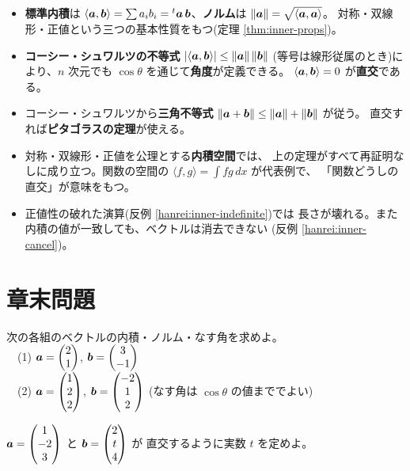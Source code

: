 \begin{matome}
\begin{itemize}
\item \textbf{標準内積}は $\langle \bm{a}, \bm{b} \rangle = \sum a_ib_i
= {}^t\bm{a}\,\bm{b}$、\textbf{ノルム}は
$\|\bm{a}\| = \sqrt{\langle \bm{a}, \bm{a} \rangle}$。
対称・双線形・正値という三つの基本性質をもつ(定理 \ref{thm:inner-props})。
\item \textbf{コーシー・シュワルツの不等式}
$|\langle \bm{a}, \bm{b} \rangle| \le \|\bm{a}\|\,\|\bm{b}\|$
(等号は線形従属のとき)により、$n$ 次元でも
$\cos\theta$ を通じて\textbf{角度}が定義できる。
$\langle \bm{a}, \bm{b} \rangle = 0$ が\textbf{直交}である。
\item コーシー・シュワルツから\textbf{三角不等式}
$\|\bm{a} + \bm{b}\| \le \|\bm{a}\| + \|\bm{b}\|$ が従う。
直交すれば\textbf{ピタゴラスの定理}が使える。
\item 対称・双線形・正値を公理とする\textbf{内積空間}では、
上の定理がすべて再証明なしに成り立つ。関数の空間の
$\langle f, g \rangle = \int f g\,dx$ が代表例で、
「関数どうしの直交」が意味をもつ。
\item 正値性の破れた演算(反例 \ref{hanrei:inner-indefinite})では
長さが壊れる。また内積の値が一致しても、ベクトルは消去できない
(反例 \ref{hanrei:inner-cancel})。
\end{itemize}
\end{matome}

\section*{章末問題}

\begin{mondai}[基本]\label{q:inner-ex1}
次の各組のベクトルの内積・ノルム・なす角を求めよ。\\
　(1) $\bm{a} = \begin{pmatrix}2 \\ 1\end{pmatrix}$, $\bm{b} = \begin{pmatrix}3 \\ -1\end{pmatrix}$\\
　(2) $\bm{a} = \begin{pmatrix}1 \\ 2 \\ 2\end{pmatrix}$, $\bm{b} = \begin{pmatrix}-2 \\ 1 \\ 2\end{pmatrix}$
(なす角は $\cos\theta$ の値まででよい)
\end{mondai}

\begin{mondai}[基本]\label{q:inner-ex2}
$\bm{a} = \begin{pmatrix}1 \\ -2 \\ 3\end{pmatrix}$ と $\bm{b} = \begin{pmatrix}2 \\ t \\ 4\end{pmatrix}$ が
直交するように実数 $t$ を定めよ。
\end{mondai}

